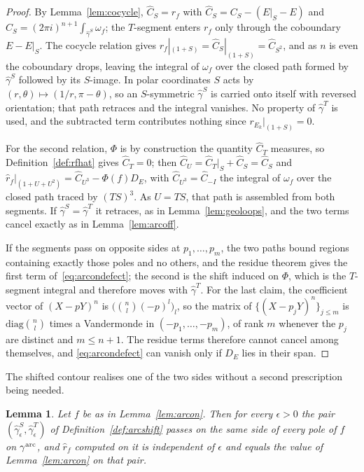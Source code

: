 \documentclass[11pt]{article}
\newtheorem{lemma}[theorem]{Lemma}
\begin{document}
\begin{proof}
By Lemma~\ref{lem:cocycle}, $\hat C_S=r_f$ with $\hat C_S=C_S-(E|_S-E)$ and
$C_S=(2\pi i)^{n+1}\int_{\hat\gamma^S}\omega_f$; the $T$-segment enters $r_f$ only through the
coboundary $E-E|_S$. The cocycle relation gives $r_f|_{(1+S)}=\hat C_S|_{(1+S)}=\hat C_{S^2}$, and
as $n$ is even the coboundary drops, leaving the integral of $\omega_f$ over the closed path formed
by $\hat\gamma^S$ followed by its $S$-image. In polar coordinates $S$ acts by
$(r,\theta)\mapsto(1/r,\pi-\theta)$, so an $S$-symmetric $\hat\gamma^S$ is carried onto itself with
reversed orientation; that path retraces and the integral vanishes. No property of $\hat\gamma^T$ is
used, and the subtracted term contributes nothing since $r_{E_k}|_{(1+S)}=0$.

For the second relation, $\Phi$ is by construction the quantity $\hat C_T$ measures, so
Definition~\ref{def:rfhat} gives $\hat C_T=0$; then $\hat C_U=\hat C_T|_S+\hat C_S=\hat C_S$ and
$\hat r_f|_{(1+U+U^2)}=\hat C_{U^3}-\Phi(f)D_E$, with $\hat C_{U^3}=\hat C_{-I}$ the integral of
$\omega_f$ over the closed path traced by $(TS)^3$. As $U=TS$, that path is assembled from both
segments. If $\hat\gamma^S=\hat\gamma^T$ it retraces, as in Lemma~\ref{lem:geoloops}, and the two
terms cancel exactly as in Lemma~\ref{lem:arcoff}.

If the segments pass on opposite sides at $p_1,\dots,p_m$, the two paths bound regions containing
exactly those poles and no others, and the residue theorem gives the first term
of~\eqref{eq:arcondefect}; the second is the shift induced on $\Phi$, which is the $T$-segment
integral and therefore moves with $\hat\gamma^T$. For the last claim, the coefficient vector of
$(X-pY)^n$ is $\big(\binom{n}{l}(-p)^{l}\big)_{l}$, so the matrix of $\{(X-p_jY)^n\}_{j\le m}$ is
$\mathrm{diag}\binom{n}{l}$ times a Vandermonde in $(-p_1,\dots,-p_m)$, of rank $m$ whenever the
$p_j$ are distinct and $m\le n+1$. The residue terms therefore cannot cancel among themselves, and
\eqref{eq:arcondefect} can vanish only if $D_E$ lies in their span.
\end{proof}


The shifted contour realises one of the two sides without a second prescription being needed.

\begin{lemma}\label{lem:arcdeform}
Let $f$ be as in Lemma~\ref{lem:arcon}. Then for every $\epsilon>0$ the pair
$(\hat\gamma^S_\epsilon,\hat\gamma^T_\epsilon)$ of Definition~\ref{def:arcshift} passes on the
same side of every pole of $f$ on $\gamma^{\rm arc}$, and $\hat r_f$ computed on it is
independent of $\epsilon$ and equals the value of Lemma~\ref{lem:arcon} on that pair.
\end{lemma}
\end{document}
